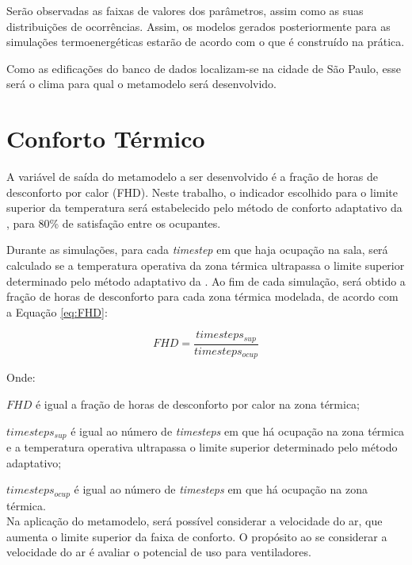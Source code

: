 \documentclass[brazil,hardcopy,openany,a5paper]{ufscthesis}
\begin{document}
		Serão observadas as faixas de valores dos parâmetros, assim como as suas distribuições de ocorrências. Assim, os modelos gerados posteriormente para as simulações termoenergéticas estarão de acordo com o que é construído na prática.
		
		Como as edificações do banco de dados localizam-se na cidade de São Paulo, esse será o clima para qual o metamodelo será desenvolvido.
		
		\section{Conforto Térmico}
		
		A variável de saída do metamodelo a ser desenvolvido é a fração de horas de desconforto por calor (FHD). Neste trabalho, o indicador escolhido para o limite superior da temperatura será estabelecido pelo método de conforto adaptativo da  \cite{ASHRAEStandard552017}, para 80\% de satisfação entre os ocupantes.

		Durante as simulações, para cada \textit{timestep} em que haja ocupação na sala, será calculado se a temperatura operativa da zona térmica ultrapassa o limite superior determinado pelo método adaptativo da  \cite{ASHRAEStandard552017}. Ao fim de cada simulação, será obtido a fração de horas de desconforto para cada zona térmica modelada, de acordo com a Equação \ref{eq:FHD}:
		
		\begin{equation}
		\label{eq:FHD}
		FHD = \frac{timesteps_{sup}}{timesteps_{ocup}}
		\end{equation}
		
		Onde:
		
		$FHD$ é igual a fração de horas de desconforto por calor na zona térmica;
		
		$timesteps_{sup}$ é igual ao número de \textit{timesteps} em que há ocupação na zona térmica e a temperatura operativa ultrapassa o limite superior determinado pelo método adaptativo;
		
		$timesteps_{ocup}$ é igual ao número de \textit{timesteps} em que há ocupação na zona térmica.
		\\
		
		Na aplicação do metamodelo, será possível considerar a velocidade do ar, que aumenta o limite superior da faixa de conforto. O propósito ao se considerar a velocidade do ar é avaliar o potencial de uso para ventiladores.		
		
\end{document}
